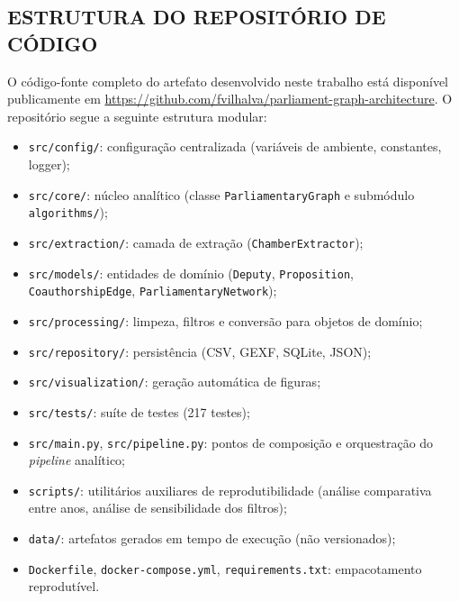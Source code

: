 \documentclass[
      12pt,
      a4paper,
      openright,
      oneside,
      chapter=TITLE,
      section=TITLE,
      english,
      french,
      spanish,
      brazilian
    ]{abntex2}
\begin{document}
        \begin{apendicesenv}
    
            \chapter{ESTRUTURA DO REPOSITÓRIO DE CÓDIGO}
    
            O código-fonte completo do artefato desenvolvido neste trabalho está
            disponível publicamente em
            \url{https://github.com/fvilhalva/parliament-graph-architecture}. O
            repositório segue a seguinte estrutura modular:
    
            \begin{itemize}
                \item \texttt{src/config/}: configuração centralizada (variáveis de ambiente, constantes, logger);
                \item \texttt{src/core/}: núcleo analítico (classe \texttt{ParliamentaryGraph} e submódulo \texttt{algorithms/});
                \item \texttt{src/extraction/}: camada de extração (\texttt{ChamberExtractor});
                \item \texttt{src/models/}: entidades de domínio (\texttt{Deputy}, \texttt{Proposition}, \texttt{CoauthorshipEdge}, \texttt{ParliamentaryNetwork});
                \item \texttt{src/processing/}: limpeza, filtros e conversão para objetos de domínio;
                \item \texttt{src/repository/}: persistência (CSV, GEXF, SQLite, JSON);
                \item \texttt{src/visualization/}: geração automática de figuras;
                \item \texttt{src/tests/}: suíte de testes (217 testes);
                \item \texttt{src/main.py}, \texttt{src/pipeline.py}: pontos de composição e orquestração do \textit{pipeline} analítico;
                \item \texttt{scripts/}: utilitários auxiliares de reprodutibilidade (análise comparativa entre anos, análise de sensibilidade dos filtros);
                \item \texttt{data/}: artefatos gerados em tempo de execução (não versionados);
                \item \texttt{Dockerfile}, \texttt{docker-compose.yml}, \texttt{requirements.txt}: empacotamento reprodutível.
            \end{itemize}
    
        \end{apendicesenv}
    
\end{document}
